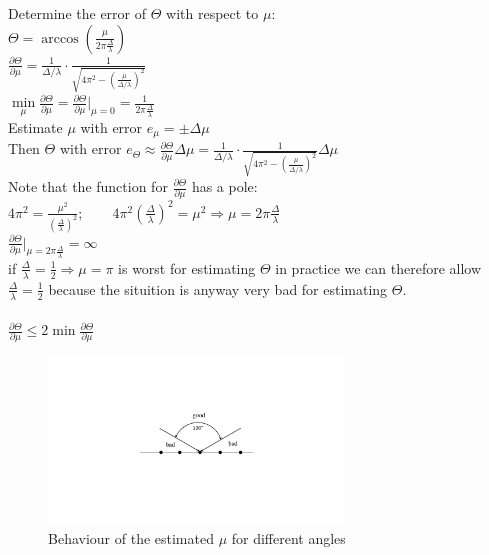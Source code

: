 \begin{doublespace}
Determine the error of $\Theta$ with respect to $\mu$:\\
$\Theta=\arccos\left(\frac{\mu}{2\pi\frac{\Delta}{\lambda}}\right)$\\
$\frac{\partial \Theta}{\partial \mu}=\frac{1}{\Delta/\lambda}\cdot \frac{1}{\sqrt{4\pi^2-\left(\frac{\mu}{\Delta/\lambda}\right)^2}}$\\
$\min\limits_\mu\frac{\partial \Theta}{\partial \mu}=\frac{\partial \Theta}{\partial \mu}\left.\right|_{\mu=0}=\frac{1}{2\pi \frac{\Delta}{\lambda}}$\\
Estimate $\mu$ with error $e_{\mu}=\pm\Delta\mu$\\
Then $\Theta$ with error $e_{\Theta}\approx\frac{\partial \Theta}{\partial \mu}\Delta\mu=\frac{1}{\Delta/\lambda}\cdot \frac{1}{\sqrt{4\pi^2-\left(\frac{\mu}{\Delta/\lambda}\right)^2}}\Delta\mu$\\
Note that the function for $\frac{\partial \Theta}{\partial \mu}$ has a pole:\\
$4\pi^2=\frac{\mu^2}{(\frac{\Delta}{\lambda})^2}; \qquad 4\pi^2(\frac{\Delta}{\lambda})^2=\mu^2 \Rightarrow \mu=2\pi \frac{\Delta}{\lambda}$\\
$\frac{\partial \Theta}{\partial \mu}\left.\right|_{\mu=2\pi \frac{\Delta}{\lambda}} = \infty$\\
if $\frac{\Delta}{\lambda} = \frac{1}{2} \Rightarrow \mu=\pi$ is worst for estimating $\Theta$
\Ra in practice we can therefore allow $\frac{\Delta}{\lambda}=\frac{1}{2}$ because the situition is anyway very bad for estimating $\Theta$.\\ \\
$\frac{\partial \Theta}{\partial \mu} \leq 2 \min \frac{\partial \Theta}{\partial \mu}$\\

\begin{figure}[H]
	\centering
		\includegraphics[trim =8cm 8cm 8cm 6cm, clip, width=0.70\textwidth]{graphics/Behaviour_of_estimation_of_mu_for_regions.pdf}
	\caption{Behaviour of the estimated $\mu$ for different angles }
	\label{fig:Behaviour_of_estimation_of_mu_for_regions}
\end{figure}


\end{doublespace}
